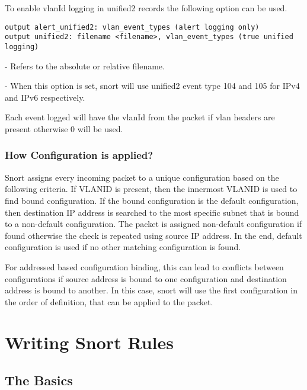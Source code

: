 \documentclass[english]{report}
\newenvironment{note}{
\samepage
    \vspace{10pt}{\textsf{
        {\hspace{7pt}\Huge{$\triangle$\hspace{-12.5pt}{\Large{$^!$}}}}\hspace{5pt}
        {\Large{NOTE}}
    }
    }
   \begin{center}
    \par\vspace{-17pt}

    \begin{lrbox}{\savepar}
    \begin{minipage}[r]{6in}
}
{
    \end{minipage}
    \end{lrbox}
    \fbox{
        \usebox{
            \savepar
	}
    }
    \par\vskip10pt
    \end{center}
}
\newenvironment{note}{
        \begin{rawhtml}
        <p><table border="1"><tr><td><b>
        Note:&nbsp;&nbsp;</b>
        \end{rawhtml}
}{
        \begin{rawhtml}
        </b></td></tr></table></p>
        \end{rawhtml}
}
\begin{document}
To enable vlanId logging in unified2 records the following option can be used.

\begin{verbatim}
output alert_unified2: vlan_event_types (alert logging only)
output unified2: filename <filename>, vlan_event_types (true unified logging)
\end{verbatim}

\begin{description}{}
\item [\texttt{filename}] - Refers to the absolute or relative filename.
\item [\texttt{vlan\_event\_types}] - When this option is set, snort will use unified2 event 
type 104 and 105 for IPv4 and IPv6 respectively. 
\end{description}

\begin{note}
Each event logged will have the vlanId from the packet if vlan headers are present 
otherwise 0 will be used.
\end{note}

\subsection{How Configuration is applied?}
Snort assigns every incoming packet to a unique configuration based on the following criteria. 
If VLANID is present, then the innermost VLANID is used to find bound configuration. If the 
bound configuration is the default configuration, then destination IP address is searched to 
the most specific subnet that is bound to a non-default  configuration. The packet is assigned 
non-default configuration if found otherwise the check is repeated using source IP address. 
In the end, default configuration is used if no other matching configuration is found.

For addressed based configuration binding, this can lead to conflicts between configurations 
if source address is bound to one configuration and destination address is bound to another. 
In this case, snort will use the first configuration in the order of definition, that can be 
applied to the packet. 


\chapter{Writing Snort Rules}
\label{Writing Snort Rules}

\section{The Basics}
\end{document}
